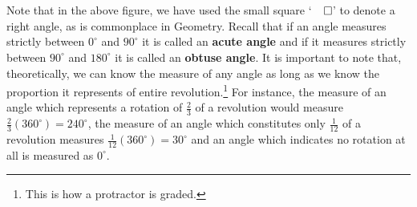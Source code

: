 \documentclass[12pt]{ximera}
\begin{document}
\[ \begin{array}{ccc}

 

&

\hspace{.5in}

 

&

\hspace{.5in}

 

\\  \end{array} \]

Note that in the above figure,  we have used the small square `$\! \! \! \! \! \! \qed$' to denote a right angle, as is commonplace in Geometry.  Recall that if an angle measures strictly between $0^{\circ}$ and $90^{\circ}$ it is called an \textbf{acute angle} and if it measures strictly between $90^{\circ}$ and $180^{\circ}$ it is called an \textbf{obtuse angle}. It is important to note that, theoretically, we can know the measure of any angle as long as we know the proportion it represents of entire revolution.\footnote{This is how a protractor is graded.}  For instance, the measure of an angle which represents a rotation of $\frac{2}{3}$ of a revolution would measure $\frac{2}{3} \left(360^{\circ}\right) = 240^{\circ}$,  the measure of an angle which constitutes only $\frac{1}{12}$ of a revolution measures $\frac{1}{12} \left(360^{\circ}\right) = 30^{\circ}$ and an angle which indicates no rotation at all is measured as $0^{\circ}$.
\end{document}
